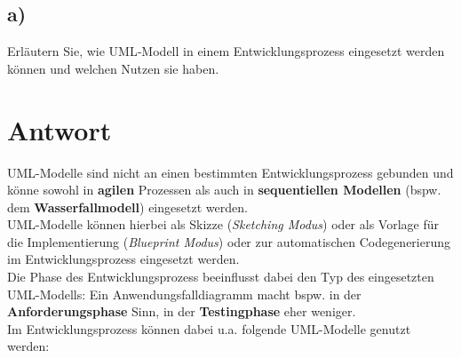 \subsection*{a)}
Erläutern Sie, wie UML‐Modell in einem Entwicklungsprozess eingesetzt werden können und welchen Nutzen sie haben.


\section*{Antwort}
UML-Modelle sind nicht an einen bestimmten Entwicklungsprozess gebunden und könne sowohl in \textbf{agilen} Prozessen als auch in \textbf{sequentiellen Modellen} (bspw. dem \textbf{Wasserfallmodell}) eingesetzt werden.\\

\noindent
UML-Modelle können hierbei als Skizze (\textit{Sketching Modus}) oder als Vorlage für die Implementierung (\textit{Blueprint Modus}) oder zur automatischen Codegenerierung im Entwicklungsprozess eingesetzt werden.\\
Die Phase des Entwicklungsprozess beeinflusst dabei den Typ des eingesetzten UML-Modells: Ein Anwendungsfalldiagramm macht bspw. in der \textbf{Anforderungsphase} Sinn, in der \textbf{Testingphase} eher weniger.\\
Im Entwicklungsprozess können dabei u.a. folgende UML-Modelle genutzt werden:

